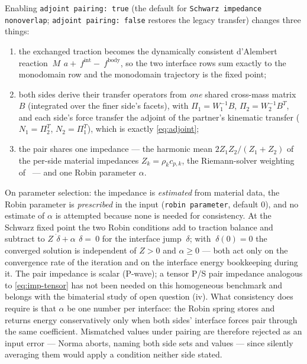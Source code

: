 \documentclass[11pt]{article}
\newcommand{\code}[1]{\texttt{#1}}
\begin{document}
Enabling \code{adjoint pairing: true} (the default for
\code{Schwarz impedance nonoverlap}; \code{adjoint pairing: false} restores
the legacy transfer) changes three things:
\begin{enumerate}[itemsep=1pt]
\item the exchanged traction becomes the dynamically consistent d'Alembert
  reaction $~M\,~a + ~f^{\mathrm{int}} - ~f^{\mathrm{body}}$, so the two
  interface rows sum exactly to the monodomain row and the monodomain
  trajectory is the fixed point;
\item both sides derive their transfer operators from \emph{one} shared
  cross-mass matrix $B$ (integrated over the finer side's facets), with
  $\Pi_1 = W_1^{-1}B$, $\Pi_2 = W_2^{-1}B^{T}$, and each side's force
  transfer the adjoint of the partner's kinematic transfer
  ($N_1 = \Pi_2^{T}$, $N_2 = \Pi_1^{T}$), which is exactly
  \eqref{eq:adjoint};
\item the pair shares one impedance --- the harmonic mean
  $2Z_1 Z_2/(Z_1 + Z_2)$ of the per-side material impedances
  $Z_k = \rho_k c_{p,k}$, the Riemann-solver weighting
  of~\cite{DuruEtAl2021,LiuEtAl2023} --- and one Robin parameter $\alpha$.
\end{enumerate}

On parameter selection: the impedance is \emph{estimated} from material
data, the Robin parameter is \emph{prescribed} in the input
(\code{robin parameter}, default $0$), and no estimate of $\alpha$ is
attempted because none is needed for consistency. At the Schwarz fixed point
the two Robin conditions add to traction balance and subtract to
$Z\,\dot{~\delta} + \alpha\,~\delta = ~0$ for the interface jump $~\delta$;
with $~\delta(0) = 0$ the converged solution is independent of $Z > 0$ and
$\alpha \ge 0$ --- both act only on the convergence rate of the iteration
and on the interface energy bookkeeping during it. The pair impedance is
scalar (P-wave); a tensor P/S pair impedance analogous to
\eqref{eq:imp-tensor} has not been needed on this homogeneous benchmark and
belongs with the bimaterial study of open question (iv). What consistency does
require is that $\alpha$ be one number per interface: the Robin spring
stores and returns energy conservatively only when both sides' interface
forces pair through the same coefficient. Mismatched values under pairing
are therefore rejected as an input error --- Norma aborts, naming both side sets and
values --- since silently averaging them would apply a condition neither
side stated.
\end{document}
